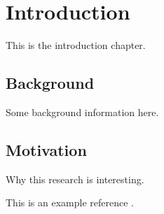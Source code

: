 \chapter*{Introduction}
This is the introduction chapter.

\section{Background}
Some background information here.

\section{Motivation}
Why this research is interesting.

This is an example reference \cite{exampleRef}.
